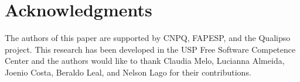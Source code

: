 \documentclass[conference]{IEEEtran}
\begin{document}
\section*{Acknowledgments}
The authors of this paper are supported by CNPQ, FAPESP, and the Qualipso project.
This research has been developed in the USP Free Software Competence Center and the
authors would like to thank Claudia Melo, Lucianna Almeida, Joenio Costa,
Beraldo Leal, and Nelson Lago for their contributions.



\end{document}
